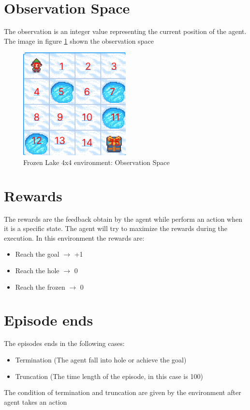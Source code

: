 \section{Observation Space}
The observation is an integer value representing the current position of the agent.
The image in figure \ref{fig:frozen_lake_environment_observation_space} shown the observation space
\begin{figure}[h]
    \centering
    \includegraphics[width=0.5\textwidth]{images/observation_space.png}
    \caption{Frozen Lake 4x4 environment: Observation Space}
    \label{fig:frozen_lake_environment_observation_space}
\end{figure}
\section{Rewards}
The rewards are the feedback obtain by the agent while perform an action when it is a specific state.
The agent will try to maximize the rewards during the execution.
In this environment the rewards are:
\begin{itemize}
    \item Reach the goal $\rightarrow$ +1
     \item Reach the hole $\rightarrow$ 0
    \item Reach the frozen $\rightarrow$ 0
\end{itemize}
\section{Episode ends}
The episodes ends in the following cases:
\begin{itemize}
    \item Termination (The agent fall into hole or achieve the goal)
    \item Truncation (The time length of the episode, in this case is 100)
\end{itemize}
The condition of termination and truncation are given by the environment after agent takes an action

